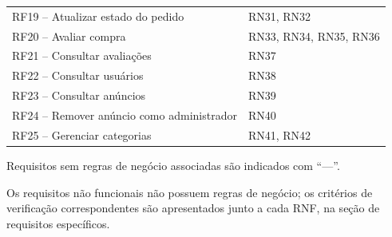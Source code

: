 \documentclass{scrreprt}
\begin{document}
\begin{center}
\begin{tabular}{@{} p{8cm} l @{}}
		RF19 -- Atualizar estado do pedido          & RN31, RN32                              \\
		RF20 -- Avaliar compra                      & RN33, RN34, RN35, RN36                  \\
		RF21 -- Consultar avaliações                & RN37                                    \\
		RF22 -- Consultar usuários                  & RN38                                    \\
		RF23 -- Consultar anúncios                  & RN39                                    \\
		RF24 -- Remover anúncio como administrador  & RN40                                    \\
		RF25 -- Gerenciar categorias                & RN41, RN42                              \\
		\bottomrule
	\end{tabular}
\end{center}

Requisitos sem regras de negócio associadas são indicados com ``---''.

Os requisitos não funcionais não possuem regras de negócio; os critérios de
verificação correspondentes são apresentados junto a cada RNF, na seção de
requisitos específicos.
\end{document}
